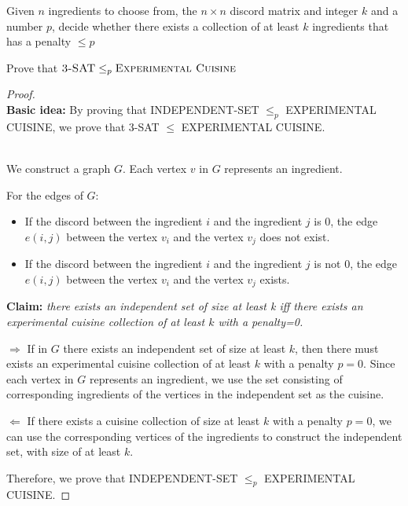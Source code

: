 \documentclass[12pt,a4paper]{article}
\theoremstyle{definition}
\begin{document}
\begin{enumerate}
        Given $n$ ingredients to choose from, the $n\times n$ discord matrix and integer $k$ and a number $p$,  decide whether there exists a collection of at least $k$ ingredients that has a penalty $\leqslant p$

    Prove that $\textsc{3-SAT}\leq_p\textsc{Experimental Cuisine}$
    
    \begin{proof}
    ~\\
   \textbf{Basic idea:} By proving that INDEPENDENT-SET $\leq_p$ EXPERIMENTAL CUISINE, we prove that 3-SAT $\leq$ EXPERIMENTAL CUISINE.
   
   ~\\
   We construct a graph $G$. Each vertex $v$ in $G$ represents an ingredient. 
   
   For the edges of $G$:
   \begin{itemize}
       \item 
   If the discord between the ingredient $i$ and the ingredient $j$ is 0, the edge $e(i,j)$ between the vertex $v_i$ and the vertex $v_j$ does not exist.
  \item 
   If the discord between the ingredient $i$ and the ingredient $j$ is not 0, the edge $e(i,j)$ between the vertex $v_i$ and the vertex $v_j$ exists.
       \end{itemize}
       
       \textbf{Claim:} \textit{there exists an independent set of size at least k iff there exists an experimental cuisine collection of at least $k$ with a penalty=0.}
       
       $\Rightarrow$
      If in $G$ there exists an independent set of size at least $k$, then there must exists an experimental cuisine collection of at least $k$ with a penalty $p=0$. Since each vertex in $G$ represents an ingredient, we use the set consisting of corresponding ingredients of the vertices in the independent set as the cuisine.
    
      $\Leftarrow$ If there exists a cuisine collection of size at least $k$ with a penalty $p=0$, we can use the corresponding vertices of the ingredients to construct the independent set, with size of at least $k$.
      
      Therefore, we prove that INDEPENDENT-SET $\leq_p$ EXPERIMENTAL CUISINE.
      

\end{proof}
\end{enumerate}
\end{document}
